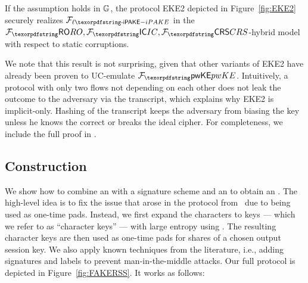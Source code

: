 \begin{theorem}
\label{theorem:lipake}
If the \CDH assumption holds in $\mathbb{G}$, the protocol EKE2 depicted in Figure~\ref{fig:EKE2} securely realizes $\FliPAKE$ in the $\Fro,\Fic,\Fcrs$-hybrid model with respect to static corruptions.
\end{theorem}
We note that this result is not surprising, given that other variants of EKE2 have already been proven to UC-emulate $\FpwKE$. Intuitively, a protocol with only two flows not depending on each other does not leak the outcome to the adversary via the transcript, which explains why EKE2 is implicit-only. Hashing of the transcript keeps the adversary from biasing the key unless he knows the correct \password or breaks the ideal cipher. For completeness, we include the full proof in .



\subsection{Construction}
We show how to combine an \RSS with a signature scheme and an \liPAKE to obtain an \FPAKE. 
The high-level idea is to fix the issue that arose in the protocol from~ due to \passwords being used as one-time pads. 
Instead, we first expand the \password characters to keys --- which we refer to as ``character keys'' --- with large entropy using \liPAKE. 
The resulting character keys are then used as one-time pads for shares of a chosen output session key. 
We also apply known techniques from the literature, i.e., adding signatures and labels to prevent man-in-the-middle attacks. 
Our full protocol is depicted in Figure~\ref{fig:FAKERSS}. 
It works as follows:

